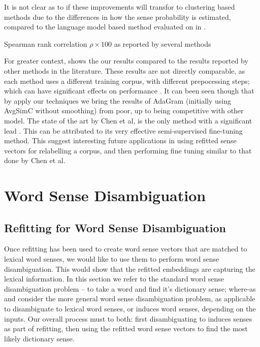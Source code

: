 \documentclass{sig-alternate}
\begin{document}
It is not clear as to if these improvements will transfor to clustering based methods due to the differences in how the sense probability is estimated, compared to the language model based method evaluated on in .

\begin{table}
	\begin{adjustbox}{max width=\columnwidth}
	\end{adjustbox}
	\caption{	
		Spearman rank correlation $\rho \times 100$  as reported by several methods\label{swscEvery}}
\end{table}

For greater context,  shows the our results compared to the results reported by other methods in the literature. These results are not directly comparable, as each method uses a different training corpus, with different prepocessing steps;  which can have significant effects on performance .
It can been seen though that by apply our techniques we bring the results of AdaGram (initially using AvgSimC without smoothing) from poor, up to being competitive with other model. The state of the art by Chen et al, is the only method with a significant lead \parencite{Chen2014}. This can be attributed to its very effective semi-supervised fine-tuning method. This suggest interesting future applications in using refitted sense vectors for relabelling a corpus, and then performing fine tuning similar to that done by Chen et al.



\section{Word Sense Disambiguation}

\subsection{Refitting for Word Sense Disambiguation} \label{lexicalWSD}
Once refitting has been used to create word sense vectors that are matched to lexical word senses, we would like to use them to perform word sense disambiguation. This would show that the refitted embeddings are capturing the lexical information. In this section we refer to the standard word sense disambiguation problem -- to take a word and find it's dictionary sense; where-as  and  consider the more general word sense disambiguation problem, as applicable to disambiguate to lexical word senses, or induces word senses, depending on the inputs. Our overall process must to both: first disambiguating to induces senses as part of refitting, then using the refitted word sense vectors to find the most likely dictionary sense.
\end{document}
